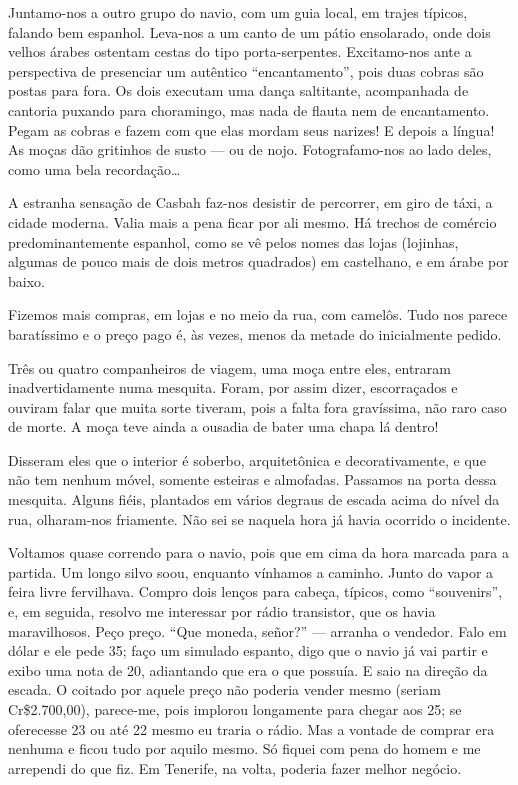 Juntamo-nos a outro grupo do navio, com um guia local, em trajes típicos, falando bem espanhol. Leva-nos a um canto de um pátio ensolarado, onde dois velhos árabes ostentam cestas do tipo porta-serpentes. Excitamo-nos ante a perspectiva de presenciar um autêntico ``encantamento'', pois duas cobras são postas para fora. Os dois executam uma dança saltitante, acompanhada de cantoria puxando para choramingo, mas nada de flauta nem de encantamento. Pegam as cobras e fazem com que elas mordam seus narizes! E depois a língua! As moças dão gritinhos de susto --- ou de nojo. Fotografamo-nos ao lado deles, como uma bela recordação\ldots

A estranha sensação de Casbah faz-nos desistir de percorrer, em giro de táxi, a cidade moderna. Valia mais a pena ficar por ali mesmo. Há trechos de comércio predominantemente espanhol, como se vê pelos nomes das lojas (lojinhas, algumas de pouco mais de dois metros quadrados) em castelhano, e em árabe por baixo.

Fizemos mais compras, em lojas e no meio da rua, com camelôs. Tudo nos parece baratíssimo e o preço pago é, às vezes, menos da metade do inicialmente pedido.

Três ou quatro companheiros de viagem, uma moça entre eles, entraram inadvertidamente numa mesquita. Foram, por assim dizer, escorraçados e ouviram falar que muita sorte tiveram, pois a falta fora gravíssima, não raro caso de morte. A moça teve ainda a ousadia de bater uma chapa lá dentro!

Disseram eles que o interior é soberbo, arquitetônica e decorativamente, e que não tem nenhum móvel, somente esteiras e almofadas. Passamos na porta dessa mesquita. Alguns fiéis, plantados em vários degraus de escada acima do nível da rua, olharam-nos friamente. Não sei se naquela hora já havia ocorrido o incidente.

Voltamos quase correndo para o navio, pois que em cima da hora marcada para a partida. Um longo silvo soou, enquanto vínhamos a caminho. Junto do vapor a feira livre fervilhava. Compro dois lenços para cabeça, típicos, como ``souvenirs'', e, em seguida, resolvo me interessar por rádio transistor, que os havia maravilhosos. Peço preço. ``Que moneda, señor?'' --- arranha o vendedor. Falo em dólar e ele pede 35; faço um simulado espanto, digo que o navio já vai partir e exibo uma nota de 20, adiantando que era o que possuía. E saio na direção da escada. O coitado por aquele preço não poderia vender mesmo (seriam Cr\$2.700,00), parece-me, pois implorou longamente para chegar aos 25; se oferecesse 23 ou até 22 mesmo eu traria o rádio. Mas a vontade de comprar era nenhuma e ficou tudo por aquilo mesmo. Só fiquei com pena do homem e me arrependi do que fiz. Em Tenerife, na volta, poderia fazer melhor negócio.

